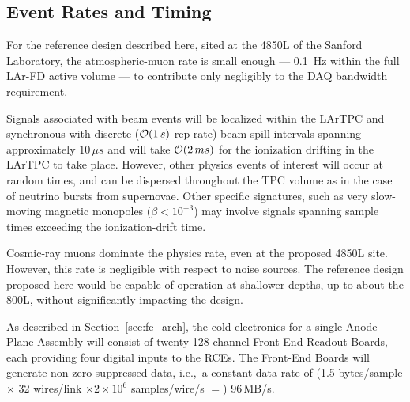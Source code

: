 \subsection{Event Rates and Timing}
\label{sec:v5-daq-assumptions}

For the reference design described here, sited at the 4850L of the Sanford Laboratory, the 
atmospheric-muon rate is small enough --- 0.1~Hz within the full LAr-FD active 
volume --- to contribute only negligibly to the DAQ bandwidth requirement.

Signals associated with beam events will be localized within the
LArTPC and synchronous with discrete (${\cal O} (1\,s)$ rep rate)
beam-spill intervals spanning approximately $10\,\mu s$ and will take
${\cal O} (2\,ms)$ for the ionization drifting in the LArTPC to take place.
However, other physics events of interest will occur at random times,
and can be dispersed throughout the TPC volume as in the case of
neutrino bursts from supernovae.  Other specific signatures, such as
very slow-moving magnetic monopoles ($\beta < 10^{-3}$) may involve
signals spanning sample times exceeding the ionization-drift time.

Cosmic-ray muons dominate the physics rate, even at the proposed 4850L
site.  However, this rate is negligible with respect to noise sources.
The reference design proposed here would be capable of operation at
shallower depths, up to about the 800L, without significantly impacting
the design.

As described in Section~\ref{sec:fe_arch}, the cold electronics for a
single Anode Plane Assembly will consist of twenty 128-channel
Front-End Readout Boards, each providing four digital inputs to the
RCEs.  The Front-End Boards will generate non-zero-suppressed data,
i.e.,\ a constant data rate of (1.5 bytes/sample $\times$ 32 wires/link
$\times 2 \times 10^6$ samples/wire/s $=$) 96\,MB/s.


